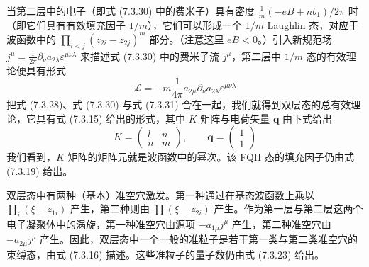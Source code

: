 当第二层中的电子（即式 (7.3.30) 中的费米子）具有密度 $\frac{1}{m}(-eB+nb_{1})/2\pi$ 时（即它们具有有效填充因子 $1/m$），它们可以形成一个 $1/m$ Laughlin 态，对应于波函数中的 $\prod_{i<j}(z_{2i}-z_{2j})^{m}$ 部分。（注意这里 $eB<0$。）引入新规范场 $j^{\mu}=\frac{1}{2\pi}\partial_{\nu}a_{2\lambda}\varepsilon^{\mu\nu\lambda}$ 来描述式 (7.3.30) 中的费米子流 $j^{\mu}$，第二层中 $1/m$ 态的有效理论便具有形式
\begin{equation*}
\mathcal{L}=-m\frac{1}{4\pi}a_{2\mu}\partial_{\nu}a_{2\lambda}\varepsilon^{\mu\nu\lambda} \tag{7.3.31}
\end{equation*}
把式 (7.3.28)、式 (7.3.30) 与式 (7.3.31) 合在一起，我们就得到双层态的总有效理论，它具有式 (7.3.15) 给出的形式，其中 $K$ 矩阵与电荷矢量 $\boldsymbol{q}$ 由下式给出
\begin{equation*}
K=\begin{pmatrix} l & n\\ n & m \end{pmatrix},\qquad
\boldsymbol{q}=\begin{pmatrix}1\\1\end{pmatrix} \tag{7.3.32}
\end{equation*}
我们看到，$K$ 矩阵的矩阵元就是波函数中的幂次。该 FQH 态的填充因子仍由式 (7.3.19) 给出。

双层态中有两种（基本）准空穴激发。第一种通过在基态波函数上乘以 $\prod_{i}(\xi-z_{1i})$ 产生，第二种则由 $\prod(\xi-z_{2i})$ 产生。作为第一层与第二层这两个电子凝聚体中的涡旋，第一种准空穴由源项 $-a_{1\mu}j^{\mu}$ 产生，第二种准空穴由 $-a_{2\mu}j^{\mu}$ 产生。因此，双层态中一个一般的准粒子是若干第一类与第二类准空穴的束缚态，由式 (7.3.16) 描述。这些准粒子的量子数仍由式 (7.3.23) 给出。

